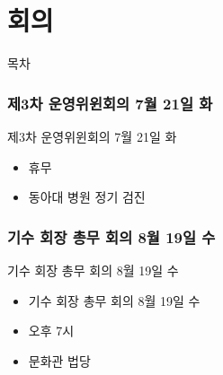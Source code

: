 \documentclass[aspectratio=1610,17pt,xcolor=pdftex,dvipsnames,table,handout]{beamer}
\begin{document}
		\part{회의 }
		\frame{\partpage}


		\begin{frame} [plain]{목차}
		\tableofcontents
		\end{frame}
		

		
				
		
		\section{제3차 운영위윈회의 7월 21일 화 }
		

		\begin{frame} [t,plain]
			\begin{block} {제3차 운영위윈회의 7월 21일 화 }
			\begin{itemize}
				\item 휴무
				\item 동아대 병원 정기 검진 
			\end{itemize}
			\end{block}
		\end{frame}


		\section{기수 회장 총무 회의 8월 19일 수 }
		

		\begin{frame} [t,plain]
			\begin{block} {기수 회장 총무 회의 8월 19일 수 }
			\begin{itemize}
				\item 기수 회장 총무 회의 8월 19일 수 
				\item 오후 7시
				\item 문화관 법당
			\end{itemize}
			\end{block}
		\end{frame}
\end{document}
